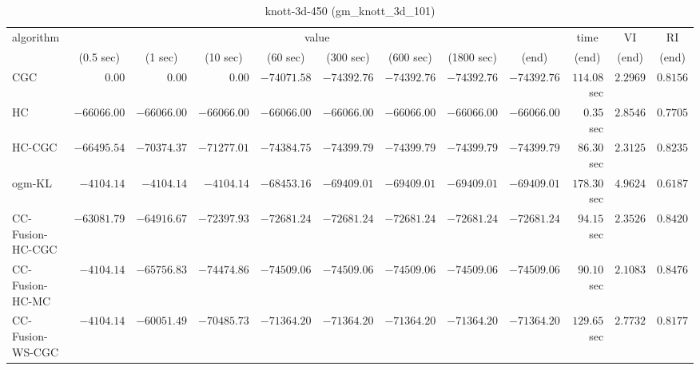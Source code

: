 \begin{table}[H]
\scriptsize
\centering
\caption{knott-3d-450 (gm\_knott\_3d\_101)}
\label{tab:anytimetable-knott-3d-450-gm-knott-3d-101}
\begin{tabular}{lrrrrrrrrrrr}
\toprule
           algorithm &                                   \multicolumn{8}{c}{value} & \multicolumn{1}{c}{time}    & \multicolumn{1}{c}{VI}  & \multicolumn{1}{c}{RI} \\  
\cmidrule(lr){2-9}\cmidrule(lr){10-10} \cmidrule(lr){11-11} \cmidrule(lr){12-12}   
                     & \multicolumn{1}{c}{(0.5 sec)} & \multicolumn{1}{c}{(1 sec)} & \multicolumn{1}{c}{(10 sec)} & \multicolumn{1}{c}{(60 sec)} & \multicolumn{1}{c}{(300 sec)} & \multicolumn{1}{c}{(600 sec)} & \multicolumn{1}{c}{(1800 sec)} & \multicolumn{1}{c}{(end)} & \multicolumn{1}{c}{(end)}    & \multicolumn{1}{c}{(end)}   & \multicolumn{1}{c}{(end)}  \\ \midrule 
                 CGC & $         0.00$ & $         0.00$ & $         0.00$ & $    -74071.58$ & $    -74392.76$ & $    -74392.76$ & $    -74392.76$ & $    -74392.76$ & $       114.08$ sec    & $       2.2969$  & $       0.8156$ \\ 
                  HC & $    -66066.00$ & $    -66066.00$ & $    -66066.00$ & $    -66066.00$ & $    -66066.00$ & $    -66066.00$ & $    -66066.00$ & $    -66066.00$ & $         0.35$ sec    & $       2.8546$  & $       0.7705$ \\ 
              HC-CGC & $    -66495.54$ & $    -70374.37$ & $    -71277.01$ & $    -74384.75$ & $    -74399.79$ & $    -74399.79$ & $    -74399.79$ & $    -74399.79$ & $        86.30$ sec    & $       2.3125$  & $       0.8235$ \\ 
              ogm-KL & $     -4104.14$ & $     -4104.14$ & $     -4104.14$ & $    -68453.16$ & $    -69409.01$ & $    -69409.01$ & $    -69409.01$ & $    -69409.01$ & $       178.30$ sec    & $       4.9624$  & $       0.6187$ \\ 
    CC-Fusion-HC-CGC & $    -63081.79$ & $    -64916.67$ & $    -72397.93$ & $    -72681.24$ & $    -72681.24$ & $    -72681.24$ & $    -72681.24$ & $    -72681.24$ & $        94.15$ sec    & $       2.3526$  & $       0.8420$ \\ 
     CC-Fusion-HC-MC & $     -4104.14$ & $    -65756.83$ & $    -74474.86$ & $    -74509.06$ & $    -74509.06$ & $    -74509.06$ & $    -74509.06$ & $    -74509.06$ & $        90.10$ sec    & $       2.1083$  & $       0.8476$ \\ 
    CC-Fusion-WS-CGC & $     -4104.14$ & $    -60051.49$ & $    -70485.73$ & $    -71364.20$ & $    -71364.20$ & $    -71364.20$ & $    -71364.20$ & $    -71364.20$ & $       129.65$ sec    & $       2.7732$  & $       0.8177$ \\ 

\end{tabular}
\end{table}
